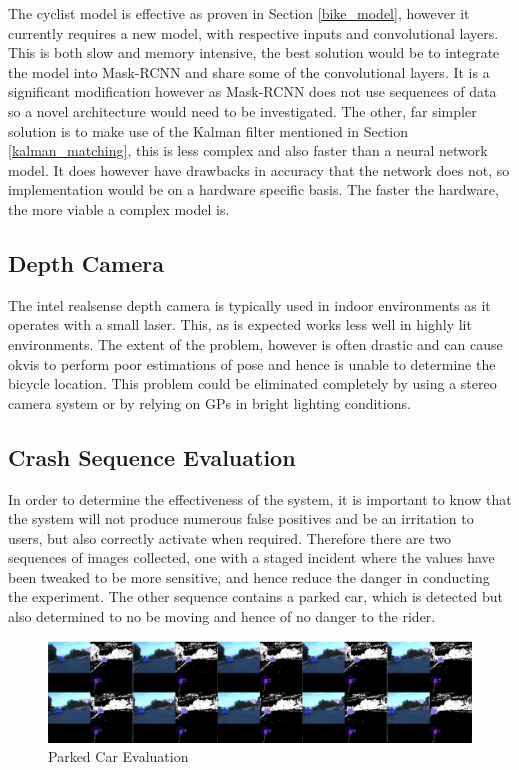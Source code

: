 \documentclass[11pt,twoside]{report}
\begin{document}
The cyclist model is effective as proven in Section \ref{bike_model}, however it currently requires a new model, with respective inputs and convolutional layers. This is both slow and memory intensive, the best solution would be to integrate the model into Mask-RCNN and share some of the convolutional layers. It is a significant modification however as Mask-RCNN does not use sequences of data so a novel architecture would need to be investigated.
\newline \newline
The other, far simpler solution is to make use of the Kalman filter mentioned in Section \ref{kalman_matching}, this is less complex and also faster than a neural network model. It does however have drawbacks in accuracy that the network does not, so implementation would be on a hardware specific basis. The faster the hardware, the more viable a complex model is.

\subsection{Depth Camera}

The intel realsense depth camera is typically used in indoor environments as it operates with a small laser. This, as is expected works less well in highly lit environments. The extent of the problem, however is often drastic and can cause okvis to perform poor estimations of pose and hence is unable to determine the bicycle location. This problem could be eliminated completely by using a stereo camera system or by relying on GPs in bright lighting conditions.

\subsection{Crash Sequence Evaluation}

In order to determine the effectiveness of the system, it is important to know that the system will not produce numerous false positives and be an irritation to users, but also correctly activate when required. Therefore there are two sequences of images collected, one with a staged incident where the values have been tweaked to be more sensitive, and hence reduce the danger in conducting the experiment. The other sequence contains a parked car, which is detected but also determined to no be moving and hence of no danger to the rider.

\noindent \begin{figure}[h!]
	\includegraphics[width = 1.0\hsize]{figures/no_crash.png}
	\caption{Parked Car Evaluation}
	\label{mrcnn_fail}
\end{figure}
\end{document}
